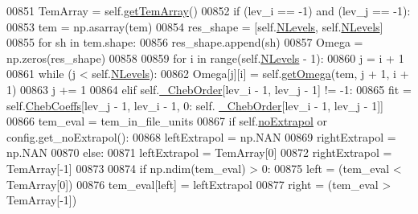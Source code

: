 \begin{DoxyCode}
00851         TemArray = self.\hyperlink{classpyneb_1_1core_1_1pynebcore_1_1___coll_data_fits_a6b53fa73abb34d16f1066dc52604f25c}{getTemArray}()
00852         \textcolor{keywordflow}{if} (lev\_i == -1) \textcolor{keywordflow}{and} (lev\_j == -1):
00853             tem = np.asarray(tem)
00854             res\_shape = [self.\hyperlink{classpyneb_1_1core_1_1pynebcore_1_1___coll_data_fits_a64b97a86b4dfb53e4cba3ce8ac0fdf00}{NLevels}, self.\hyperlink{classpyneb_1_1core_1_1pynebcore_1_1___coll_data_fits_a64b97a86b4dfb53e4cba3ce8ac0fdf00}{NLevels}]
00855             \textcolor{keywordflow}{for} sh \textcolor{keywordflow}{in} tem.shape:
00856                 res\_shape.append(sh)
00857             Omega = np.zeros(res\_shape)
00858     
00859             \textcolor{keywordflow}{for} i \textcolor{keywordflow}{in} range(self.\hyperlink{classpyneb_1_1core_1_1pynebcore_1_1___coll_data_fits_a64b97a86b4dfb53e4cba3ce8ac0fdf00}{NLevels} - 1):
00860                 j = i + 1
00861                 \textcolor{keywordflow}{while} (j < self.\hyperlink{classpyneb_1_1core_1_1pynebcore_1_1___coll_data_fits_a64b97a86b4dfb53e4cba3ce8ac0fdf00}{NLevels}):
00862                     Omega[j][i] = self.\hyperlink{classpyneb_1_1core_1_1pynebcore_1_1___coll_data_fits_a07beca7cf9ee37f231754f0458fb8c2f}{getOmega}(tem, j + 1, i + 1)
00863                     j += 1
00864         \textcolor{keywordflow}{elif} self.\hyperlink{classpyneb_1_1core_1_1pynebcore_1_1___coll_data_fits_aeb6a6f312ca21c1e1b3aa72225a0d442}{\_ChebOrder}[lev\_i - 1, lev\_j - 1] != -1:
00865             fit = self.\hyperlink{classpyneb_1_1core_1_1pynebcore_1_1___coll_data_fits_af8eaa90b2ddbf77c0a78b648e9f66971}{ChebCoeffs}[lev\_j - 1, lev\_i - 1, 0: self.
      \hyperlink{classpyneb_1_1core_1_1pynebcore_1_1___coll_data_fits_aeb6a6f312ca21c1e1b3aa72225a0d442}{\_ChebOrder}[lev\_i - 1, lev\_j - 1]]
00866             tem\_eval = tem\_in\_file\_units
00867             \textcolor{keywordflow}{if} self.\hyperlink{classpyneb_1_1core_1_1pynebcore_1_1___coll_data_fits_a97b30abb66948d40dc2077a3c3b15231}{noExtrapol} \textcolor{keywordflow}{or} config.get\_noExtrapol():
00868                 leftExtrapol = np.NAN
00869                 rightExtrapol = np.NAN
00870             \textcolor{keywordflow}{else}:
00871                 leftExtrapol = TemArray[0]
00872                 rightExtrapol = TemArray[-1]
00873             
00874             \textcolor{keywordflow}{if} np.ndim(tem\_eval) > 0:
00875                 left = (tem\_eval < TemArray[0])
00876                 tem\_eval[left] = leftExtrapol
00877                 right = (tem\_eval > TemArray[-1])

\end{DoxyCode}
